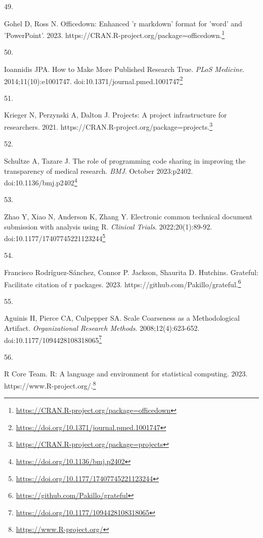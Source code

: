 \documentclass[
  a4paper,
]{book}
\newlength{\cslhangindent}
\newlength{\csllabelwidth}
\newlength{\cslentryspacingunit} %
\newenvironment{CSLReferences}[2] %
 {%
  \setlength{\parindent}{0pt}
  \ifodd #1
  \let\oldpar\par
  \def\par{\hangindent=\cslhangindent\oldpar}
  \fi
  \setlength{\parskip}{#2\cslentryspacingunit}
 }%
 {}
\newcommand{\CSLLeftMargin}[1]{\parbox[t]{\csllabelwidth}{#1}}
\newcommand{\CSLRightInline}[1]{\parbox[t]{\linewidth - \csllabelwidth}{#1}\break}
\renewcommand{\href}[2]{#2\footnote{\url{#1}}}
\begin{document}
\begin{CSLReferences}{0}{0}
\leavevmode{}%
\CSLLeftMargin{49. }%
\CSLRightInline{Gohel D, Ross N. Officedown: Enhanced 'r markdown' format for 'word' and 'PowerPoint'. 2023. \href{https://CRAN.R-project.org/package=officedown}{https://CRAN.R-project.org/package=officedown.}}

\leavevmode{}%
\CSLLeftMargin{50. }%
\CSLRightInline{Ioannidis JPA. How to Make More Published Research True. \emph{PLoS Medicine}. 2014;11(10):e1001747. doi:\href{https://doi.org/10.1371/journal.pmed.1001747}{10.1371/journal.pmed.1001747}}

\leavevmode{}%
\CSLLeftMargin{51. }%
\CSLRightInline{Krieger N, Perzynski A, Dalton J. Projects: A project infrastructure for researchers. 2021. \href{https://CRAN.R-project.org/package=projects}{https://CRAN.R-project.org/package=projects.}}

\leavevmode{}%
\CSLLeftMargin{52. }%
\CSLRightInline{Schultze A, Tazare J. The role of programming code sharing in improving the transparency of medical research. \emph{BMJ}. October 2023:p2402. doi:\href{https://doi.org/10.1136/bmj.p2402}{10.1136/bmj.p2402}}

\leavevmode{}%
\CSLLeftMargin{53. }%
\CSLRightInline{Zhao Y, Xiao N, Anderson K, Zhang Y. Electronic common technical document submission with analysis using R. \emph{Clinical Trials}. 2022;20(1):89-92. doi:\href{https://doi.org/10.1177/17407745221123244}{10.1177/17407745221123244}}

\leavevmode{}%
\CSLLeftMargin{54. }%
\CSLRightInline{Francisco Rodríguez-Sánchez, Connor P. Jackson, Shaurita D. Hutchins. Grateful: Facilitate citation of r packages. 2023. \href{https://github.com/Pakillo/grateful}{https://github.com/Pakillo/grateful.}}

\leavevmode{}%
\CSLLeftMargin{55. }%
\CSLRightInline{Aguinis H, Pierce CA, Culpepper SA. Scale Coarseness as a Methodological Artifact. \emph{Organizational Research Methods}. 2008;12(4):623-652. doi:\href{https://doi.org/10.1177/1094428108318065}{10.1177/1094428108318065}}

\leavevmode{}%
\CSLLeftMargin{56. }%
\CSLRightInline{R Core Team. R: A language and environment for statistical computing. 2023. \href{https://www.R-project.org/}{https://www.R-project.org/.}}


\end{CSLReferences}
\end{document}
